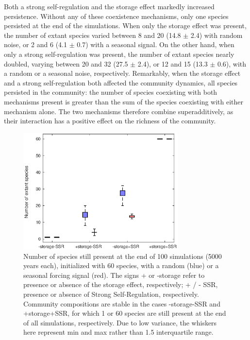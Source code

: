 \documentclass[a4paper,12pt]{article}
\begin{document}
Both a strong self-regulation and the storage effect markedly increased
persistence. Without any of these coexistence mechanisms, only one
species persisted at the end of the simulations. When only the storage
effect was present, the number of extant species varied between 8
and 20 (14.8 $\pm$ 2.4) with random noise, or 2 and 6 (4.1 $\pm$
0.7) with a seasonal signal. On the other hand, when only a strong
self-regulation was present, the number of extant species nearly doubled,
varying between 20 and 32 (27.5 $\pm$ 2.4), or 12 and 15 (13.3 $\pm$
0.6), with a random or a seasonal noise, respectively. Remarkably,
when the storage effect and a strong self-regulation both affected
the community dynamics, all species persisted in the community: the
number of species coexisting with both mechanisms present is greater
than the sum of the species coexisting with either mechanism alone.
The two mechanisms therefore combine superadditively, as their interaction
has a positive effect on the richness of the community.

\begin{figure}[!ht]
\begin{centering}
\includegraphics[width=0.75\textwidth]{Fig2}
\par\end{centering}
\caption{Number of species still present at the end of 100 simulations (5000
years each), initialized with 60 species, with a random (blue) or
a seasonal forcing signal (red). The signs + or -storage refer to
presence or absence of the storage effect, respectively; + / - SSR,
presence or absence of Strong Self-Regulation, respectively. Community
compositions are stable in the cases -storage-SSR and +storage+SSR,
for which 1 or 60 species are still present at the end of all simulations,
respectively. Due to low variance, the whiskers here represent min
and max rather than 1.5 interquartile range. \label{fig:Persistence-of-species}}
\end{figure}
\end{document}
